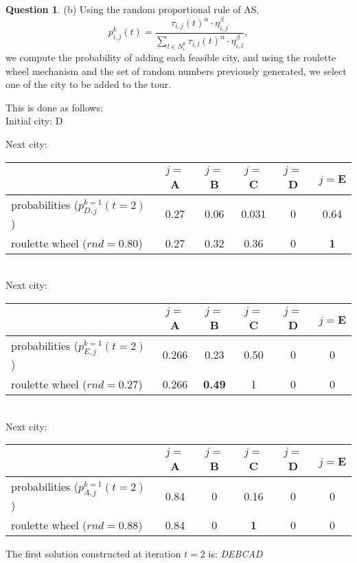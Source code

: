 \documentclass[11pt,a4paper]{article}
\theoremstyle{definition}%
\newtheorem{Q}{Question}[] %
\begin{document}
\begin{Q}
{    (b) 
    Using the random proportional rule of AS, 
    $$p^k_{i,j}(t)= \frac{\tau_{i,j}(t)^{\alpha}\cdot \eta_{i,j}^{\beta}}{\sum_{l\in N^k_i}  \tau_{i,l}(t)^{\alpha}\cdot \eta_{i,l}^{\beta} },$$
    we compute the probability of adding each feasible city, and using the roulette wheel
    mechanism and the set of random numbers previously generated, we select one of the city to be added to the tour.
    
    This is done as follows: \\
     	Initial city: D

		Next city:\\
	     \begin{tabular} { l | c |c | c | c | c |}
			\cline{2-6}
			& $j=$A  &  $j=$B  &  $j=$C  &  $j=$D  &  $j=$E\\
			\hline
			probabilities ($p^{k=1}_{D,j}(t=2)$) &  0.27 & 0.06 & 0.031 & 0 & 0.64\\
			\hline
            roulette wheel ($rnd= 0.80$) & 0.27 & 0.32 & 0.36 & 0 & \textbf{1}\\
			\hline
		\end{tabular}\\

        Next city:\\
	     \begin{tabular} { l | c |c | c | c | c |}
			\cline{2-6}
			& $j=$A  &  $j=$B  &  $j=$C  &  $j=$D  &  $j=$E\\
			\hline
			probabilities ($p^{k=1}_{E,j}(t=2)$) &  0.266  & 0.23  & 0.50  &  0  & 0\\
			\hline
            roulette wheel ($rnd= 0.27$) & 0.266  & \textbf{0.49}  & 1 & 0 & 0\\
			\hline
		\end{tabular}\\

		Next city:\\
	     \begin{tabular} { l | c |c | c | c | c |}
			\cline{2-6}
			& $j=$A  &  $j=$B  &  $j=$C  &  $j=$D  &  $j=$E\\
			\hline
			probabilities ($p^{k=1}_{A,j}(t=2)$) &  0.84 & 0 & 0.16  &  0  & 0\\
			\hline
            roulette wheel ($rnd= 0.88$) & 0.84 & 0 & \textbf{1}  &  0  & 0\\
			\hline
		\end{tabular}

        The first solution constructed at iteration $t=2$ is: \textit{DEBCAD} %


}
\end{Q}
\end{document}
